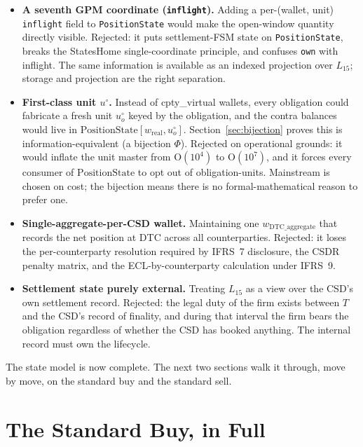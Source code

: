 \documentclass[11pt,a4paper]{article}
\begin{document}
\begin{itemize}[nosep]
\item \textbf{A seventh GPM coordinate (\texttt{inflight}).} Adding a per-(wallet, unit) \texttt{inflight} field to \texttt{PositionState} would make the open-window quantity directly visible. Rejected: it puts settlement-FSM state on \texttt{PositionState}, breaks the StatesHome single-coordinate principle, and confuses \texttt{own} with inflight. The same information is available as an indexed projection over $L_{15}$; storage and projection are the right separation.
\item \textbf{First-class unit $u^\circ$.} Instead of cpty\_virtual wallets, every obligation could fabricate a fresh unit $u^\circ_o$ keyed by the obligation, and the contra balances would live in $\mathrm{PositionState}[w_{\mathrm{real}}, u^\circ_o]$. Section~\ref{sec:bijection} proves this is information-equivalent (a bijection $\Phi$). Rejected on operational grounds: it would inflate the unit master from $\mathrm{O}(10^4)$ to $\mathrm{O}(10^7)$, and it forces every consumer of $\mathrm{PositionState}$ to opt out of obligation-units. Mainstream is chosen on cost; the bijection means there is no formal-mathematical reason to prefer one.
\item \textbf{Single-aggregate-per-CSD wallet.} Maintaining one $w_{\mathrm{DTC\_aggregate}}$ that records the net position at DTC across all counterparties. Rejected: it loses the per-counterparty resolution required by IFRS~7 disclosure, the CSDR penalty matrix, and the ECL-by-counterparty calculation under IFRS~9.
\item \textbf{Settlement state purely external.} Treating $L_{15}$ as a view over the CSD's own settlement record. Rejected: the legal duty of the firm exists between $T$ and the CSD's record of finality, and during that interval the firm bears the obligation regardless of whether the CSD has booked anything. The internal record must own the lifecycle.
\end{itemize}

The state model is now complete. The next two sections walk it through, move by move, on the standard buy and the standard sell.

\clearpage
\section{The Standard Buy, in Full}
\label{sec:standard-buy}
\end{document}
